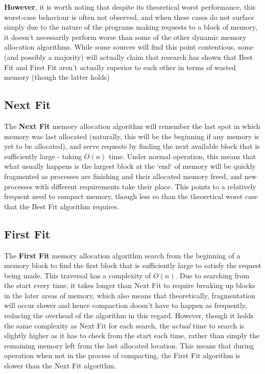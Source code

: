 \documentclass[11pt]{article}
\begin{document}
\textbf{However}, it is worth noting that despite its theoretical worst performance, this worst-case behaviour is often not observed, and when these cases do not surface simply due to the nature of the programs making requests to a block of memory, it doesn't necessarily perform worse than some of the other dynamic memory allocation algorithms. While some sources will find this point contentious, some (and possibly a majority) will actually claim that research has shown that Best Fit and First Fit aren't actually superior to each other in terms of wasted memory (though the latter holds) 

\subsection{Next Fit}
The \textbf{Next Fit} memory allocation algorithm will remember the last spot in which memory was last allocated (naturally, this will be the beginning if any memory is yet to be allocated), and serve requests by finding the next available block that is sufficiently large - taking $O(n)$ time. Under normal operation, this means that what usually happens is the largest block at the `end` of memory will be quickly fragmented as processes are finishing and their allocated memory freed, and new processes with different requirements take their place. This points to a relatively frequent need to compact memory, though less so than the theoretical worst case that the Best Fit algorithm requires.

\subsection{First Fit}
The \textbf{First Fit} memory allocation algorithm search from the beginning of a memory block to find the first block that is sufficiently large to satisfy the request being made. This traversal has a complexity of $O(n)$. Due to searching from the start every time, it takes longer than Next Fit to require breaking up blocks in the later areas of memory, which also means that theoretically, fragmentation will occur slower and hence compaction doesn't have to happen as frequently, reducing the overhead of the algorithm in this regard. However, though it holds the same complexity as Next Fit for each search, the \textit{actual} time to search is slightly higher as it has to check from the start each time, rather than simply the remaining memory left from the last allocated location. This means that during operation when not in the process of compacting, the First Fit algorithm is slower than the Next Fit algorithm. 
\end{document}
